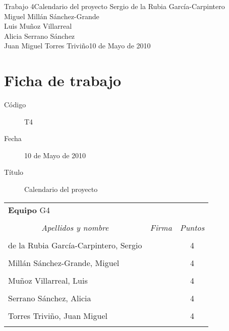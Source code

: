 \documentclass[11pt,a4paper,spanish,twoside]{book}
\begin{document}


{Trabajo 4}{Calendario del proyecto}
{Sergio de la Rubia García-Carpintero\\Miguel Millán Sánchez-Grande\\
  Luis Muñoz Villarreal\\Alicia Serrano Sánchez\\
  Juan Miguel Torres Triviño}{10 de Mayo de 2010}


\chapter*{Ficha de trabajo}
\begin{description}
\item[Código] T4
\item[Fecha] 10 de Mayo de 2010
\item[Título] Calendario del proyecto
\end{description}

\begin{table}[!ht]
  \centering
  \begin{tabular}{lp{5cm}c}
    \multicolumn{3}{l}{\Large \textbf{Equipo} G4} \\ \\
    \multicolumn{1}{c}{\emph{Apellidos y nombre}} & 
    \multicolumn{1}{c}{\emph{Firma}} & \emph{Puntos} \\
    \hline \\
    de la Rubia García-Carpintero, Sergio & & 4 \\ \\
    Millán Sánchez-Grande, Miguel         & & 4 \\ \\
    Muñoz Villarreal, Luis                & & 4 \\ \\
    Serrano Sánchez, Alicia               & & 4 \\ \\
    Torres Triviño, Juan Miguel           & & 4 \\ \\
    \hline
  \end{tabular}
\end{table}
\end{document}
